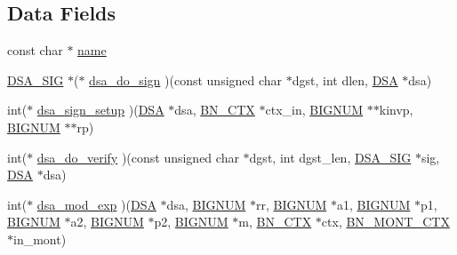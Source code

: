 \subsection*{Data Fields}
\begin{DoxyCompactItemize}
\item 
const char $\ast$ \hyperlink{structdsa__method_a8f8f80d37794cde9472343e4487ba3eb}{name}
\item 
\hyperlink{dsa_8h_a48a9879e7bbc21af161fb409c679f3c8}{D\+S\+A\+\_\+\+S\+IG} $\ast$($\ast$ \hyperlink{structdsa__method_a6f3a5323466cd100b9bf9f7c111670d7}{dsa\+\_\+do\+\_\+sign} )(const unsigned char $\ast$dgst, int dlen, \hyperlink{crypto_2ossl__typ_8h_aa26536f205a5c5f39111260bf246ed9d}{D\+SA} $\ast$dsa)
\item 
int($\ast$ \hyperlink{structdsa__method_af0059982f4eccb54a9d0f2f908a48eba}{dsa\+\_\+sign\+\_\+setup} )(\hyperlink{crypto_2ossl__typ_8h_aa26536f205a5c5f39111260bf246ed9d}{D\+SA} $\ast$dsa, \hyperlink{crypto_2ossl__typ_8h_a0b235a35b7dd7922c097571ecd90e2bc}{B\+N\+\_\+\+C\+TX} $\ast$ctx\+\_\+in, \hyperlink{crypto_2ossl__typ_8h_a6fb19728907ec6515e4bfb716bffa141}{B\+I\+G\+N\+UM} $\ast$$\ast$kinvp, \hyperlink{crypto_2ossl__typ_8h_a6fb19728907ec6515e4bfb716bffa141}{B\+I\+G\+N\+UM} $\ast$$\ast$rp)
\item 
int($\ast$ \hyperlink{structdsa__method_a28873c19e7180892d8084c85baf67976}{dsa\+\_\+do\+\_\+verify} )(const unsigned char $\ast$dgst, int dgst\+\_\+len, \hyperlink{dsa_8h_a48a9879e7bbc21af161fb409c679f3c8}{D\+S\+A\+\_\+\+S\+IG} $\ast$sig, \hyperlink{crypto_2ossl__typ_8h_aa26536f205a5c5f39111260bf246ed9d}{D\+SA} $\ast$dsa)
\item 
int($\ast$ \hyperlink{structdsa__method_a7ce3ad12cefddeceb1cd1e18b6d95f78}{dsa\+\_\+mod\+\_\+exp} )(\hyperlink{crypto_2ossl__typ_8h_aa26536f205a5c5f39111260bf246ed9d}{D\+SA} $\ast$dsa, \hyperlink{crypto_2ossl__typ_8h_a6fb19728907ec6515e4bfb716bffa141}{B\+I\+G\+N\+UM} $\ast$rr, \hyperlink{crypto_2ossl__typ_8h_a6fb19728907ec6515e4bfb716bffa141}{B\+I\+G\+N\+UM} $\ast$a1, \hyperlink{crypto_2ossl__typ_8h_a6fb19728907ec6515e4bfb716bffa141}{B\+I\+G\+N\+UM} $\ast$p1, \hyperlink{crypto_2ossl__typ_8h_a6fb19728907ec6515e4bfb716bffa141}{B\+I\+G\+N\+UM} $\ast$a2, \hyperlink{crypto_2ossl__typ_8h_a6fb19728907ec6515e4bfb716bffa141}{B\+I\+G\+N\+UM} $\ast$p2, \hyperlink{crypto_2ossl__typ_8h_a6fb19728907ec6515e4bfb716bffa141}{B\+I\+G\+N\+UM} $\ast$m, \hyperlink{crypto_2ossl__typ_8h_a0b235a35b7dd7922c097571ecd90e2bc}{B\+N\+\_\+\+C\+TX} $\ast$ctx, \hyperlink{crypto_2ossl__typ_8h_aec902d353e00ced6d3fee6cd033a8bd0}{B\+N\+\_\+\+M\+O\+N\+T\+\_\+\+C\+TX} $\ast$in\+\_\+mont)

\end{DoxyCompactItemize}
